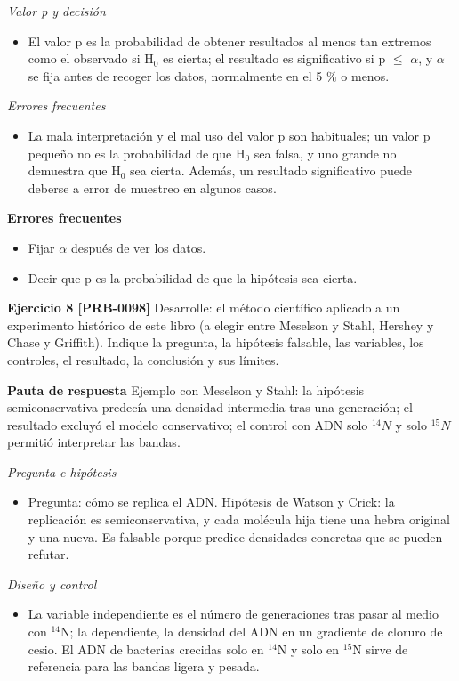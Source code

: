 \documentclass{book}
\begin{document}
\noindent\textit{Valor p y decisión}
\begin{itemize}
\item El valor p es la probabilidad de obtener resultados al menos tan extremos como el observado si H\({}_{0}\) es cierta; el resultado es significativo si p \(\leq\) \(\alpha\), y \(\alpha\) se fija antes de recoger los datos, normalmente en el 5 \% o menos.
\end{itemize}

\noindent\textit{Errores frecuentes}
\begin{itemize}
\item La mala interpretación y el mal uso del valor p son habituales; un valor p pequeño no es la probabilidad de que H\({}_{0}\) sea falsa, y uno grande no demuestra que H\({}_{0}\) sea cierta. Además, un resultado significativo puede deberse a error de muestreo en algunos casos.
\end{itemize}

\noindent\textbf{Errores frecuentes}
\begin{itemize}
\item Fijar \(\alpha\) después de ver los datos.
\item Decir que p es la probabilidad de que la hipótesis sea cierta.
\end{itemize}

\noindent\textbf{Ejercicio 8 [PRB-0098]}
Desarrolle: el método científico aplicado a un experimento histórico de este libro (a elegir entre Meselson y Stahl, Hershey y Chase y Griffith). Indique la pregunta, la hipótesis falsable, las variables, los controles, el resultado, la conclusión y sus límites.


\noindent\textbf{Pauta de respuesta}
Ejemplo con Meselson y Stahl: la hipótesis semiconservativa predecía una densidad intermedia tras una generación; el resultado excluyó el modelo conservativo; el control con ADN solo \({}^{14}N\) y solo \({}^{15}N\) permitió interpretar las bandas.


\noindent\textit{Pregunta e hipótesis}
\begin{itemize}
\item Pregunta: cómo se replica el ADN. Hipótesis de Watson y Crick: la replicación es semiconservativa, y cada molécula hija tiene una hebra original y una nueva. Es falsable porque predice densidades concretas que se pueden refutar.
\end{itemize}

\noindent\textit{Diseño y control}
\begin{itemize}
\item La variable independiente es el número de generaciones tras pasar al medio con \({}^{14}\)N; la dependiente, la densidad del ADN en un gradiente de cloruro de cesio. El ADN de bacterias crecidas solo en \({}^{14}\)N y solo en \({}^{15}\)N sirve de referencia para las bandas ligera y pesada.
\end{itemize}
\end{document}
